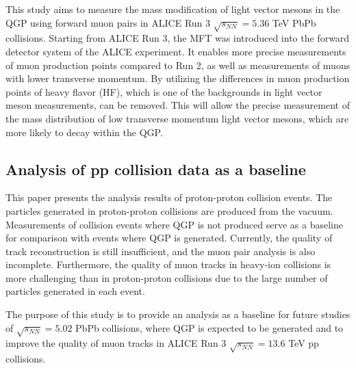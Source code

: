         This study aims to measure the mass modification of light vector mesons in the QGP using forward muon pairs in ALICE Run 3 $\sqrt{s_{NN}} = 5.36$ TeV PbPb collisions. Starting from ALICE Run 3, the MFT was introduced into the forward detector system of the ALICE experiment. It enables more precise measurements of muon production points compared to Run 2, as well as measurements of muons with lower transverse momentum. By utilizing the differences in muon production points of heavy flavor (HF), which is one of the backgrounds in light vector meson measurements, can be removed. This will allow the precise measurement of the mass distribution of low transverse momentum light vector mesons, which are more likely to decay within the QGP.\@
    \subsection{Analysis of pp collision data as a baseline}
    This paper presents the analysis results of proton-proton collision events. The particles generated in proton-proton collisions are produced from the vacuum. Measurements of collision events where QGP is not produced serve as a baseline for comparison with events where QGP is generated. Currently, the quality of track reconstruction is still insufficient, and the muon pair analysis is also incomplete. Furthermore, the quality of muon tracks in heavy-ion collisions is more challenging than in proton-proton collisions due to the large number of particles generated in each event.  

    The purpose of this study is to provide an analysis as a baseline for future studies of $\sqrt{s_{NN}} = 5.02$ PbPb collisions, where QGP is expected to be generated and to improve the quality of muon tracks in ALICE Run 3 $\sqrt{s_{NN}} = 13.6$ TeV pp collisions.